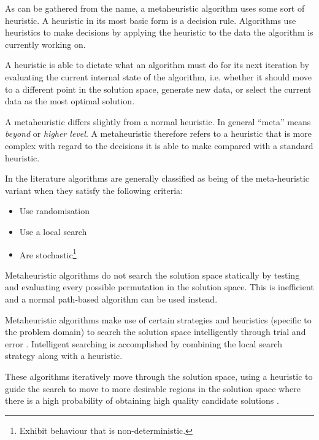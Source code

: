 As can be gathered from the name, a metaheuristic algorithm uses some sort of heuristic. A heuristic in its most basic form is a decision rule. Algorithms use heuristics to make decisions by applying the heuristic to the data the algorithm is currently working on\cite{AIModernApproach,NatureInspiredMetaHeuristic}.

A heuristic is able to dictate what an algorithm must do for its next iteration by evaluating the current internal state of the algorithm, i.e. whether it should move to a different point in the solution space, generate new data, or select the current data as the most optimal solution\cite{AIModernApproach,NatureInspiredMetaHeuristic}.

A metaheuristic differs slightly from a normal heuristic. In general ``meta'' means \emph{beyond} or \emph{higher level}\cite{AIModernApproach,NatureInspiredMetaHeuristic}. A metaheuristic therefore refers to a heuristic that is more complex with regard to the decisions it is able to make compared with a standard heuristic\cite{AIModernApproach,NatureInspiredMetaHeuristic}.

In the literature algorithms are generally classified as being of the meta-heuristic variant when they satisfy the following criteria\cite{AIModernApproach,NatureInspiredMetaHeuristic}:
\begin{itemize}
	\item Use randomisation
	\item Use a local search
	\item Are stochastic\footnote{Exhibit behaviour that is non-deterministic.}
\end{itemize}

Metaheuristic algorithms do not search the solution space statically by testing and evaluating every possible permutation in the solution space. This is inefficient and a normal path-based algorithm can be used instead\cite{MetaAgricultural}.

Metaheuristic algorithms make use of certain strategies and heuristics (specific to the problem domain) to search the solution space intelligently through trial and error \cite{MetaAgricultural}. Intelligent searching is accomplished by combining the local search strategy along with a heuristic\cite{NatureInspiredMetaHeuristic,AIModernApproach,CompuIntelligenceIntro}. 

These algorithms iteratively move through the solution space, using a heuristic to guide the search to move to more desirable regions in the solution space where there is a high probability of obtaining high quality candidate solutions \cite{TabuMontemanniSmith,SweepMeta}.

